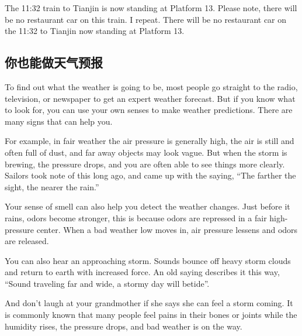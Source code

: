 The 11:32 train to Tianjin is now standing at Platform 13.
Please note, there will be no restaurant car on this train. I
repeat. There will be no restaurant car on the 11:32 to Tianjin
now standing at Platform 13.

\subsection{你也能做天气预报}
To find out what the weather is going to be, most people
go straight to the radio, television, or newspaper to get an
expert weather forecast. But if you know what to look
for, you can use your own senses to make weather predictions.
There are many signs that can help you.

For example, in fair weather the air pressure is generally
high, the air is still and often full of dust, and far away objects
may look vague. But when the storm is brewing,
the pressure drops, and you are often able to see things
more clearly. Sailors took note of this long ago, and
came up with the saying, “The farther the sight, the nearer
the rain.”

Your sense of smell can also help you detect the weather
changes. Just before it rains, odors become stronger, this is
because odors are repressed in a fair high-pressure center.
When a bad weather low moves in, air pressure lessens
and odors are released.

You can also hear an approaching storm. Sounds bounce
off heavy storm clouds and return to earth with increased
force. An old saying describes it this way, “Sound
traveling far and wide, a stormy day will betide”.

And don't laugh at your grandmother if she says she can
feel a storm coming. It is commonly known that many
people feel pains in their bones or joints while the humidity
rises, the pressure drops, and bad weather is on the way.